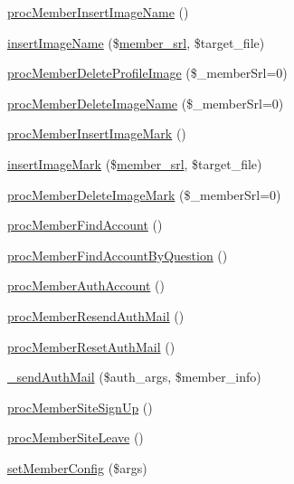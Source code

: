 \begin{DoxyCompactItemize}
\item 
\hyperlink{classmemberController_a5477f3466e28c09d13f182406893a3d6}{proc\+Member\+Insert\+Image\+Name} ()
\item 
\hyperlink{classmemberController_a723651429eec4409cc58daefb508e7bf}{insert\+Image\+Name} (\$\hyperlink{ko_8install_8php_aa61f9e08f0fe505094d26f8143f30bbd}{member\+\_\+srl}, \$target\+\_\+file)
\item 
\hyperlink{classmemberController_a469c2f84ff27c0fb9fc9ae7f3b921548}{proc\+Member\+Delete\+Profile\+Image} (\$\+\_\+member\+Srl=0)
\item 
\hyperlink{classmemberController_a5b2d6f21719829dcf1b422e9958bcf48}{proc\+Member\+Delete\+Image\+Name} (\$\+\_\+member\+Srl=0)
\item 
\hyperlink{classmemberController_afcb874e178e1c13158e364b891998640}{proc\+Member\+Insert\+Image\+Mark} ()
\item 
\hyperlink{classmemberController_a99efb504d3ab31a6365434696cb7b2fb}{insert\+Image\+Mark} (\$\hyperlink{ko_8install_8php_aa61f9e08f0fe505094d26f8143f30bbd}{member\+\_\+srl}, \$target\+\_\+file)
\item 
\hyperlink{classmemberController_a22dff50295755ba06fb55d60104dbb32}{proc\+Member\+Delete\+Image\+Mark} (\$\+\_\+member\+Srl=0)
\item 
\hyperlink{classmemberController_a6ba64b98fa5d0fd55435e464f02d050e}{proc\+Member\+Find\+Account} ()
\item 
\hyperlink{classmemberController_a1141d3b40fc5927dcbaff3b4b4b11bff}{proc\+Member\+Find\+Account\+By\+Question} ()
\item 
\hyperlink{classmemberController_a2dfdfbe05e0248b65c9aadf969195c12}{proc\+Member\+Auth\+Account} ()
\item 
\hyperlink{classmemberController_aa0e4416a4e98fc31701ba68581b7c14b}{proc\+Member\+Resend\+Auth\+Mail} ()
\item 
\hyperlink{classmemberController_ab0515bd2aae55dbda2049d39612ef6b2}{proc\+Member\+Reset\+Auth\+Mail} ()
\item 
\hyperlink{classmemberController_a8768cc1066bf70222fdd0f0fa2d55d31}{\+\_\+send\+Auth\+Mail} (\$auth\+\_\+args, \$member\+\_\+info)
\item 
\hyperlink{classmemberController_a4dfc326f5bc6d97b86b919c568457000}{proc\+Member\+Site\+Sign\+Up} ()
\item 
\hyperlink{classmemberController_a46240bb8dbfcff52844ce8387076ca61}{proc\+Member\+Site\+Leave} ()
\item 
\hyperlink{classmemberController_a842fafd2abf22d779591486124003d92}{set\+Member\+Config} (\$args)

\end{DoxyCompactItemize}
